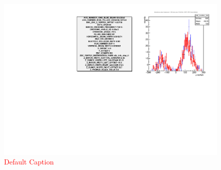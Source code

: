 \begin{figure}
\begin{center}
\includegraphics[width=\linewidth,height=\textheight,keepaspectratio]{./figures/zvertex_compare_hscan_pos_1000_359711}
\caption{ \textcolor{red}{Default Caption} }
\label{fig:zvertex_compare_hscan_pos_1000_359711}
\end{center}
\end{figure}
